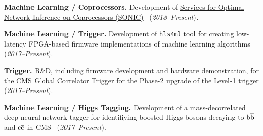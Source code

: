 \documentclass[12pt]{res}
\begin{document}
\begin{resume}
\textbf{Machine Learning / Coprocessors.} Development of \href{https://github.com/hls-fpga-machine-learning/SonicCMS}{Services for Optimal Network Inference on Coprocessors (SONIC)}~\cite{Duarte:2019fta,neurips2019_sonic} (\textit{2018--Present}).

\textbf{Machine Learning / Trigger.} Development of
\href{https://fastmachinelearning.org/hls4ml/}{\texttt{hls4ml}}
tool for creating low-latency FPGA-based firmware
  implementations of machine learning algorithms~\cite{Duarte:2018ite,Summers:2020xiy,bnnpaper,neurips2019_hls4ml} (\textit{2017--Present}).

\textbf{Trigger.} R\&D, including firmware development and hardware demonstration, for
the CMS Global Correlator Trigger for the Phase-2 upgrade of the
Level-1 trigger (\emph{2017--Present}).

\textbf{Machine Learning / Higgs Tagging.} Development of a mass-decorrelated deep neural network tagger
  for identifiying boosted Higgs bosons decaying to $\mathrm{b}\overline{\mathrm{b}}$ and $\mathrm{c}\overline{\mathrm{c}}$ in CMS~\cite{CMS-DP-2018-046,Moreno:2019bmu,Moreno:2019neq,neurips2019_hbb}
  (\textit{2017--Present}).



\end{resume}
\end{document}
